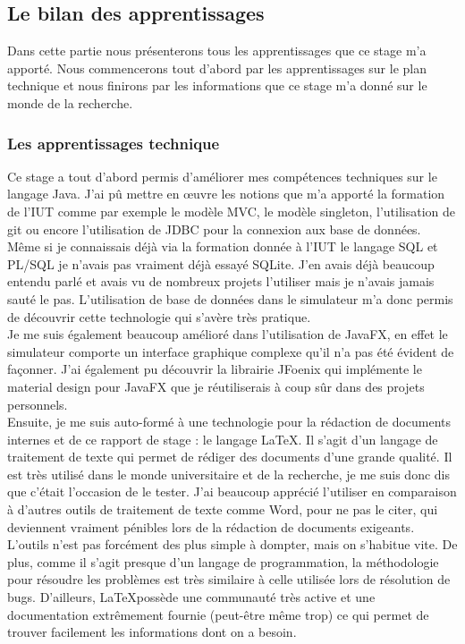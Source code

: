 \subsection{Le bilan des apprentissages}
Dans cette partie nous présenterons tous les apprentissages que ce stage m'a apporté. Nous commencerons tout d'abord par les apprentissages sur le plan technique et nous finirons par les informations que ce stage m'a donné sur le monde de la recherche.

\subsubsection{Les apprentissages technique}
Ce stage a tout d'abord permis d'améliorer mes compétences techniques sur le langage Java. J'ai pû mettre en œuvre les notions que m'a apporté la formation de l'IUT comme par exemple le modèle MVC, le modèle singleton, l'utilisation de git ou encore l'utilisation de JDBC pour la connexion aux base de données.\\

Même si je connaissais déjà via la formation donnée à l'IUT le langage SQL et PL/SQL je n'avais pas vraiment déjà essayé SQLite. J'en avais déjà beaucoup entendu parlé et avais vu de nombreux projets l'utiliser mais je n'avais jamais sauté le pas. L'utilisation de base de données dans le simulateur m'a donc permis de découvrir cette technologie qui s'avère très pratique.\\

Je me suis également beaucoup amélioré dans l'utilisation de JavaFX, en effet le simulateur comporte un interface graphique complexe qu'il n'a pas été évident de façonner. J'ai également pu découvrir la librairie JFoenix qui implémente le material design pour JavaFX que je réutiliserais à coup sûr dans des projets personnels.\\

Ensuite, je me suis auto-formé à une technologie pour la rédaction de documents internes et de ce rapport de stage : le langage \LaTeX. Il s'agit d'un langage de traitement de texte qui permet de rédiger des documents d'une grande qualité. Il est très utilisé dans le monde universitaire et de la recherche, je me suis donc dis que c'était l'occasion de le tester. J'ai beaucoup apprécié l'utiliser en comparaison à d'autres outils de traitement de texte comme Word, pour ne pas le citer, qui deviennent vraiment pénibles lors de la rédaction de documents exigeants. L'outils n'est pas forcément des plus simple à dompter, mais on s'habitue vite. De plus, comme il s'agit presque d'un langage de programmation, la méthodologie pour résoudre les problèmes est très similaire à celle utilisée lors de résolution de bugs. D'ailleurs, \LaTeX possède une communauté très active et une documentation extrêmement fournie (peut-être même trop) ce qui permet de trouver facilement les informations dont on a besoin.\\

